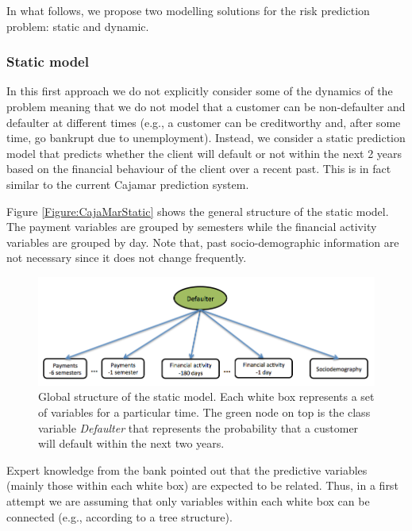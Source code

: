 In what follows, we propose two modelling solutions for the risk prediction problem: static and dynamic.

\subsubsection*{Static model} 

In this first approach we do not explicitly consider some of the dynamics of the problem meaning that we do not model that a customer can be non-defaulter and defaulter at different times (e.g., a customer can be creditworthy and, after some time, go bankrupt due to unemployment). Instead, we consider a static prediction model that predicts whether the client will default or not within the next 2 years based on the financial behaviour of the client over a recent past. This is in fact similar to the current Cajamar prediction system. 

Figure \ref{Figure:CajaMarStatic} shows the general structure of the static model. The payment variables are grouped by semesters while the financial activity variables are grouped by day. Note that, past socio-demographic information are not necessary since it does not change frequently.

\begin{figure}[ht!]
  \centering
\includegraphics[scale=0.5]{./figures/CajaMarModel0}
\caption{\label{Figure:CajaMarStatic}Global structure of the static model. Each white box represents a set of variables for a particular time. The green node on top is the class variable \emph{Defaulter} that represents the probability that a customer will default within the next two years. } 
\label{fig:CajamarStaticModel}
\end{figure}

Expert knowledge from the bank pointed out that the predictive variables (mainly those within each white box) are expected to be related. Thus, in a first attempt we are assuming that only variables within each white box can be connected (e.g., according to a tree structure).

